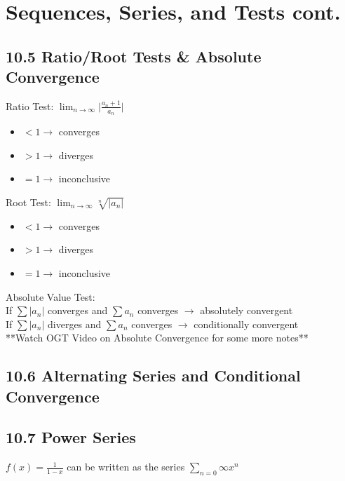 \documentclass{article}
\begin{document}
    \section{Sequences, Series, and Tests cont.}
        \color{Emerald}
        \subsection*{10.5 Ratio/Root Tests \& Absolute Convergence}
            Ratio Test: $\lim_{n\to\infty} \lvert \frac{a_{n} + 1}{a_{n}} \rvert$ \\
            \begin{itemize}
                \item $< 1 \rightarrow$ converges \\
                \item $> 1 \rightarrow$ diverges \\
                \item $= 1 \rightarrow$ inconclusive \\
            \end{itemize}
            Root Test: $\lim_{n\to\infty} \sqrt[n]{\lvert a_{n} \rvert}$ \\
            \begin{itemize}
                \item $< 1 \rightarrow$ converges \\
                \item $> 1 \rightarrow$ diverges \\
                \item $= 1 \rightarrow$ inconclusive \\
            \end{itemize}
            Absolute Value Test: \\
            If $\sum \lvert a_{n} \rvert$ converges and $\sum a_{n}$ converges $\rightarrow$ absolutely convergent \\
            If $\sum \lvert a_{n} \rvert$ diverges and $\sum a_{n}$ converges $\rightarrow$ conditionally convergent \\
            **Watch OGT Video on Absolute Convergence for some more notes** \\
        \color{Black}
        \subsection*{10.6 Alternating Series and Conditional Convergence}
        \color{Mulberry}
        \subsection*{10.7 Power Series}
            $f(x) = \frac{1}{1-x}$ can be written as the series $\sum_{n=0}{\infty} x^n$ \\
        \color{Black}
\end{document}
